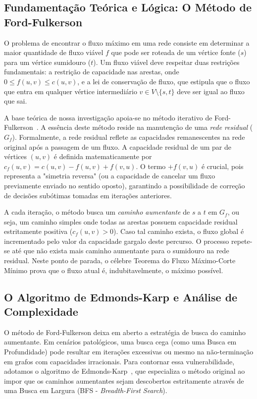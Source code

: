 \documentclass[12pt,a4paper]{article}
\begin{document}
\subsection{Fundamentação Teórica e Lógica: O Método de Ford-Fulkerson}
O problema de encontrar o fluxo máximo em uma rede consiste em determinar a maior quantidade de fluxo viável $f$ que pode ser roteada de um vértice fonte ($s$) para um vértice sumidouro ($t$). Um fluxo viável deve respeitar duas restrições fundamentais: a restrição de capacidade nas arestas, onde $0 \le f(u,v) \le c(u,v)$, e a lei de conservação de fluxo, que estipula que o fluxo que entra em qualquer vértice intermediário $v \in V \setminus \{s, t\}$ deve ser igual ao fluxo que sai.

A base teórica de nossa investigação apoia-se no método iterativo de Ford-Fulkerson~\cite{ford1956maximal}. A essência deste método reside na manutenção de uma \textit{rede residual} ($G_f$). Formalmente, a rede residual reflete as capacidades remanescentes na rede original após a passagem de um fluxo. A capacidade residual de um par de vértices $(u,v)$ é definida matematicamente por $c_f(u,v) = c(u,v) - f(u,v) + f(v,u)$. O termo $+ f(v,u)$ é crucial, pois representa a "simetria reversa" (ou a capacidade de cancelar um fluxo previamente enviado no sentido oposto), garantindo a possibilidade de correção de decisões subótimas tomadas em iterações anteriores.

A cada iteração, o método busca um \textit{caminho aumentante} de $s$ a $t$ em $G_f$, ou seja, um caminho simples onde todas as arestas possuem capacidade residual estritamente positiva ($c_f(u,v) > 0$). Caso tal caminho exista, o fluxo global é incrementado pelo valor da capacidade gargalo deste percurso. O processo repete-se até que não exista mais caminho aumentante para o sumidouro na rede residual. Neste ponto de parada, o célebre Teorema do Fluxo Máximo-Corte Mínimo prova que o fluxo atual é, indubitavelmente, o máximo possível.

\subsection{O Algoritmo de Edmonds-Karp e Análise de Complexidade}
O método de Ford-Fulkerson deixa em aberto a estratégia de busca do caminho aumentante. Em cenários patológicos, uma busca cega (como uma Busca em Profundidade) pode resultar em iterações excessivas ou mesmo na não-terminação em grafos com capacidades irracionais. Para contornar essa vulnerabilidade, adotamos o algoritmo de Edmonds-Karp~\cite{edmonds1972theoretical}, que especializa o método original ao impor que os caminhos aumentantes sejam descobertos estritamente através de uma Busca em Largura (BFS - \textit{Breadth-First Search}). 
\end{document}
